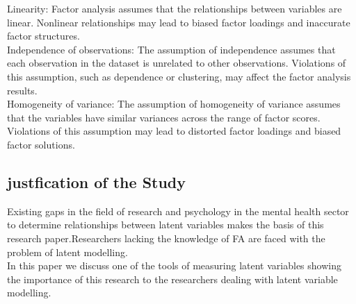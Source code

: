 \documentclass[12pt]{article}
\begin{document}
\noindent Linearity: Factor analysis assumes that the relationships between variables are linear. Nonlinear relationships may lead to biased factor loadings and inaccurate factor structures.\\

\noindent Independence of observations: The assumption of independence assumes that each observation in the dataset is unrelated to other observations. Violations of this assumption, such as dependence or clustering, may affect the factor analysis results.\\

\noindent Homogeneity of variance: The assumption of homogeneity of variance assumes that the variables have similar variances across the range of factor scores. Violations of this assumption may lead to distorted factor loadings and biased factor solutions.\\

\subsection{justfication of the Study}
Existing gaps in the field of research and psychology in the mental health sector to determine relationships between latent variables makes the basis of this research paper.Researchers lacking the knowledge of FA are faced with the problem of latent modelling.\\
In this paper we discuss one of the tools of measuring latent variables showing the importance of this research to the researchers dealing with latent variable modelling. 
\end{document}
